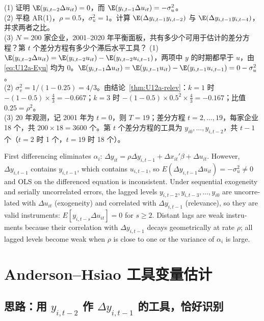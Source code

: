 \begin{prac}[差分方程的工具]\label{pr:U12a-3}
(1) 证明 $\E(y_{i,t-2}\Delta u_{it})=0$，而 $\E(y_{i,t-1}\Delta u_{it})=-\sigma_u^2$。\\
(2) 平稳 AR(1)，$\rho=0.5$，$\sigma_u^2=1$。计算 $\E(\Delta y_{i,t-1}y_{i,t-2})$ 与 $\E(\Delta y_{i,t-1}y_{i,t-4})$，并求两者之比。\\
(3) $N=200$ 家企业，2001–2020 年平衡面板，共有多少个可用于估计的差分方程？第 $t$ 个差分方程有多少个滞后水平工具？
\answer
(1) $\E(y_{i,t-2}\Delta u_{it})=\E(y_{i,t-2}u_{it})-\E(y_{i,t-2}u_{i,t-1})$，两项中 $y$ 的时期都早于 $u$，由 \eqref{eq:U12a-Eyu} 均为 0。$\E(y_{i,t-1}\Delta u_{it})=\E(y_{i,t-1}u_{it})-\E(y_{i,t-1}u_{i,t-1})=0-\sigma_u^2$。\\
(2) $\sigma_v^2=1/(1-0.25)=4/3$。由结论~\ref{thm:U12a-relev}：$k=1$ 时 $-(1-0.5)\times\frac43=-0.667$；$k=3$ 时 $-(1-0.5)\times0.5^2\times\frac43=-0.167$；比值 $0.25=\rho^2$。\\
(3) 20 年观测，记 2001 年为 $t=0$，则 $T=19$；差分方程 $t=2,\dots,19$，每家企业 18 个，共 $200\times18=3600$ 个。第 $t$ 个差分方程的工具为 $y_{i0},\dots,y_{i,t-2}$，共 $t-1$ 个（$t=2$ 时 1 个，$t=19$ 时 18 个）。
\end{prac}

\begin{english}
First differencing eliminates $\alpha_i$: $\Delta y_{it}=\rho\Delta y_{i,t-1}+\Delta x_{it}'\beta+\Delta u_{it}$. However, $\Delta y_{i,t-1}$ contains $y_{i,t-1}$, which contains $u_{i,t-1}$, so $E(\Delta y_{i,t-1}\Delta u_{it})=-\sigma_u^2\neq0$ and OLS on the differenced equation is inconsistent. Under sequential exogeneity and serially uncorrelated errors, the lagged levels $y_{i,t-2},y_{i,t-3},\dots,y_{i0}$ are uncorrelated with $\Delta u_{it}$ (exogeneity) and correlated with $\Delta y_{i,t-1}$ (relevance), so they are valid instruments: $E[y_{i,t-s}\Delta u_{it}]=0$ for $s\ge2$. Distant lags are weak instruments because their correlation with $\Delta y_{i,t-1}$ decays geometrically at rate $\rho$; all lagged levels become weak when $\rho$ is close to one or the variance of $\alpha_i$ is large.
\end{english}

\section{Anderson–Hsiao 工具变量估计}\label{sec:U12a-ah}

\subsection{思路：用 \texorpdfstring{$y_{i,t-2}$}{y\_(i,t-2)} 作 \texorpdfstring{$\Delta y_{i,t-1}$}{Delta y\_(i,t-1)} 的工具，恰好识别}

